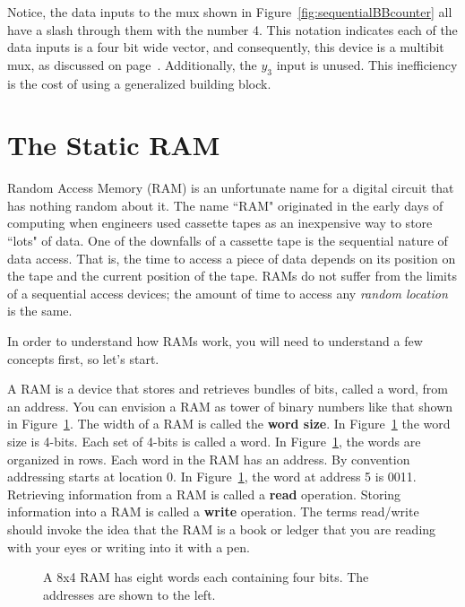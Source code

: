 Notice, the data inputs to the mux shown in Figure~\ref{fig:sequentialBBcounter}
all have a slash through them with
the number 4.  This notation indicates each of the data inputs is a four
bit wide
vector, and consequently, this device is a multibit mux, as discussed on
page~\pageref{page:wmu}.  Additionally, the $y_3$ input is unused.  This
inefficiency is the cost of using a generalized building block.


\section{The Static RAM}
Random Access Memory (RAM) is an unfortunate name for a digital circuit
that has nothing random about it.  The name ``RAM" originated in the early
days of computing when engineers used cassette tapes as an inexpensive way
to store ``lots" of data.  One of the downfalls of a cassette tape is the
sequential nature of data access.  That is, the time to access a piece of
data depends on its position on the tape and the current position of the
tape.  RAMs do not suffer from the limits of a sequential access devices; the
amount of time to access any \textit{random location} is the same.

In order to understand how RAMs work, you will need to understand a few
concepts first, so let's start.

A RAM is a device that stores and retrieves bundles of bits, called
a word, from an address.  You can envision a RAM as tower
of binary numbers like that shown in Figure~\ref{fig:sequentialBBram}.
The width of a RAM is called the \textbf{word size}.  In Figure~\ref{fig:sequentialBBram}
the word size is 4-bits.  Each set of 4-bits is called a word.  In
Figure~\ref{fig:sequentialBBram}, the words are organized in rows.
Each word in the RAM has an address. By convention addressing
starts at location 0.  In Figure~\ref{fig:sequentialBBram}, the word at
address 5 is 0011.  Retrieving information from a RAM is called a
\textbf{read} operation.  Storing information into a RAM is called a \textbf{write}
operation.  The terms read/write should invoke the idea that the RAM is a
book or ledger that you are reading with your eyes or writing into it with a pen.

\begin{figure}[ht]
\caption{A 8x4 RAM has eight words each containing four bits.  The addresses
are shown to the left.}
\label{fig:sequentialBBram}
\end{figure}

